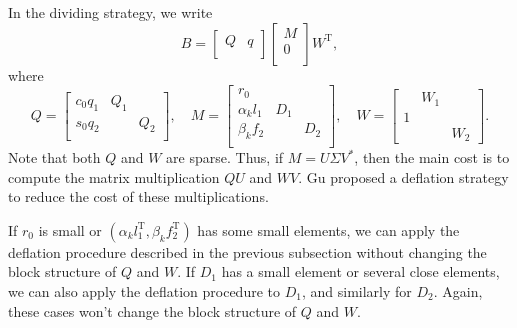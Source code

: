 \documentclass[12pt]{article}
\newcommand{\op}{\operatorname}
\begin{document}
In the dividing strategy, we write
\[
    B = \begin{bmatrix}
        Q & q \\
    \end{bmatrix}
    \begin{bmatrix}
        M \\
        0 \\
    \end{bmatrix}
    W^{\op T},
\]
where
\[
    Q = \begin{bmatrix}
        c_0 q_1 & Q_1 \\
        s_0 q_2 & & Q_2 \\
    \end{bmatrix}, \quad M = \begin{bmatrix}
        r_0 \\
        \alpha_k l_1 & D_1 \\
        \beta_k f_2 &  & D_2 \\
    \end{bmatrix}, \quad W = \begin{bmatrix}
        & W_1 \\
        1 \\
        & & W_2
    \end{bmatrix}.
\]
Note that both \(Q\) and \(W\) are sparse. Thus, if \(M = U \Sigma V^*\), then the main cost is to compute the matrix multiplication \(QU\) and \(WV\). Gu proposed a deflation strategy to reduce the cost of these multiplications. 

If \(r_0\) is small or \((\alpha_k l_1^{\op T}, \beta_k f_2^{\op T})\) has some small elements, we can apply the deflation procedure described in the previous subsection without changing the block structure of \(Q\) and \(W\). If \(D_1\) has a small element or several close elements, we can also apply the deflation procedure to \(D_1\), and similarly for \(D_2\). Again, these cases won't change the block structure of \(Q\) and \(W\).
\end{document}

